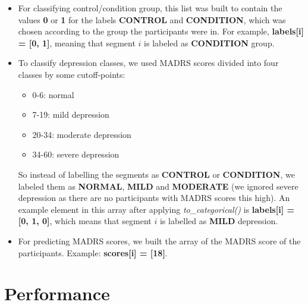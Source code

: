 \begin{itemize}
  \item For classifying control/condition group, this list was built to contain the values \textbf{0} or \textbf{1} for the labels \textbf{CONTROL} and \textbf{CONDITION}, which was chosen according to the group the participants were in. For example, \textbf{labels[i] = [0, 1]}, meaning that segment $i$ is labeled as \textbf{CONDITION} group. 
  
  \item To classify depression classes, we used MADRS scores divided into four classes by some cutoff-points:
  \begin{itemize}
    \item 0-6: normal
    \item 7-19: mild depression
    \item 20-34: moderate depression
    \item 34-60: severe depression
  \end{itemize}
  So instead of labelling the segments as \textbf{CONTROL} or \textbf{CONDITION}, we labeled them as \textbf{NORMAL}, \textbf{MILD} and \textbf{MODERATE} (we ignored severe depression as there are no participants with MADRS scores this high). An example element in this array after applying \textit{to\_categorical()} is \textbf{labels[i] = [0, 1, 0]}, which means that segment $i$ is labelled as \textbf{MILD} depression.
  \item For predicting MADRS scores, we built the array of the MADRS score of the participants. Example: \textbf{scores[i] = [18]}.
\end{itemize}

\section{Performance}

